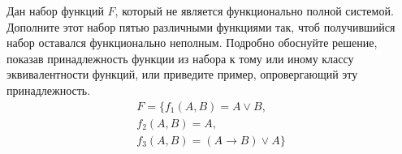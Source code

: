 \question
Дан набор функций $F$, который не является функционально полной системой. Дополните этот набор пятью различными функциями так, чтоб получившийся набор оставался функционально неполным. Подробно обоснуйте решение, показав  принадлежность функции из набора к тому или иному классу эквивалентности функций, или приведите пример, опровергающий эту принадлежность. 
\begin{gather*}
F = \{f_1(A,B) = A \lor B, \\
f_2(A,B) = A, \\
f_3(A,B) = (A \to B)\lor A\}
\end{gather*}

